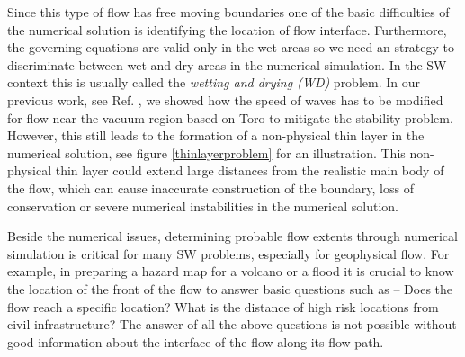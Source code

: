 \documentclass[letterpaper,10pt]{article}
\begin{document}
Since this type of flow has free moving boundaries one of the basic difficulties 
of the numerical solution is identifying the location of flow interface. 
Furthermore, the governing equations are valid only in the wet areas so we need an strategy to discriminate between wet and dry areas in the numerical simulation. 
In the SW context this is usually called the {\it wetting and drying (WD)} problem. %
In our previous work, see Ref. \cite{Patra2005}, we showed how the speed of waves has to be modified for flow near the vacuum region based on Toro \cite{ToroBook2001} to mitigate 
the stability problem. However, this still leads to the formation of a non-physical thin layer in the numerical solution, see figure \ref{thinlayerproblem} for an illustration.
This non-physical thin layer could extend large distances from the realistic main 
body of the flow, which can cause inaccurate construction of the boundary, loss of conservation or severe 
numerical instabilities in the numerical solution. 

Beside the numerical issues, determining probable flow extents through numerical simulation is critical for many SW problems, especially for geophysical flow. For example, in preparing a hazard map 
for a volcano or a flood it is crucial to know the location of the front of the flow to answer basic questions such as --  Does the flow reach a specific location? What is the distance of high 
risk locations from civil infrastructure? 
The answer of all the above questions is not possible without good information about the interface of the flow along its flow path.
\end{document}
